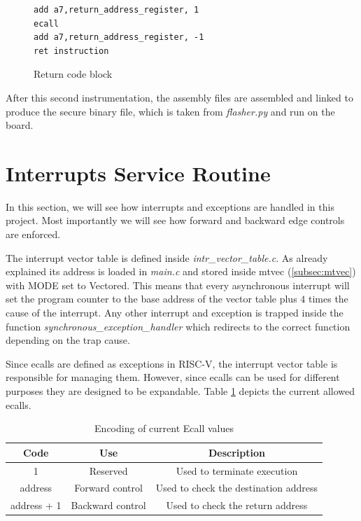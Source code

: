 \begin{figure}[htbp]
  \centering
  \begin{lstlisting}[style=Assembly]
add a7,return_address_register, 1
ecall
add a7,return_address_register, -1
ret instruction
 \end{lstlisting}
  \caption{Return code block}
  \label{fig:retblock}
\end{figure}

After this second instrumentation, the assembly files are assembled and linked to
produce the secure binary file, which is taken from \textit{flasher.py} and run on
the board.

\section{Interrupts Service Routine}
\label{sec:project_isr}

In this section, we will see how interrupts and exceptions are handled in this project.
Most importantly we will see how forward and backward edge controls are enforced.

The interrupt vector table is defined inside \textit{intr\_vector\_table.c}. As
already explained its address is loaded in \textit{main.c} and stored inside mtvec
(\ref{subsec:mtvec}) with MODE set to Vectored. This means that every
asynchronous interrupt will set the program counter to the base address of the
vector table plus $4$ times the cause of the interrupt. Any other interrupt and exception
is trapped inside the function \textit{synchronous\_exception\_handler} which
redirects to the correct function depending on the trap cause.

Since ecalls are defined as exceptions in RISC-V, the interrupt vector table is responsible
for managing them. However, since ecalls can be used for different purposes they
are designed to be expandable. Table \ref{tab:ecalls} depicts the current
allowed ecalls.

\begin{table}
  \centering
  \begin{tabular}{|c|c|c|}
    \hline
    \textbf{Code} & \textbf{Use}     & \textbf{Description}                  \\
    \hline
    1             & Reserved         & Used to terminate execution           \\
    \hline
    address       & Forward control  & Used to check the destination address \\
    \hline
    address + 1   & Backward control & Used to check the return address      \\
    \hline
  \end{tabular}
  \caption{Encoding of current Ecall values}
  \label{tab:ecalls}
\end{table}

